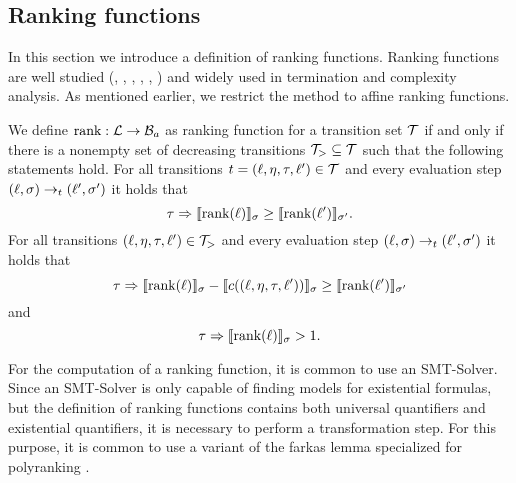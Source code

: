 \subsection{Ranking functions}

In this section we introduce a definition of ranking functions.
Ranking functions are well studied (\cite{bradley2005polyranking}, \cite{podelski2004prf}, \cite{bradley2005linear}, \cite{bagnara2012new}, \cite{leike2014ranking}, \cite{ben2013linear}) and widely used in termination and complexity analysis.
As mentioned earlier, we restrict the method to affine ranking functions.

\begin{definition} 
	We define $\text{rank}: \mathcal{L} \rightarrow \mathcal{B}_a$ as ranking function for a transition set $\mathcal{T}$ if and only if there is a nonempty set of decreasing transitions $\mathcal{T}_{>} \subseteq \mathcal{T}$ such that the following statements hold.
        For all transitions $t = (\ell, \eta, \tau, \ell') \in \mathcal{T}$ and every evaluation step $(\ell, \sigma) \rightarrow_t (\ell', \sigma')$ it holds that
	\[ \tau \Rightarrow \llbracket \text{rank}(\ell) \rrbracket_{\sigma} \geq \llbracket \text{rank}(\ell') \rrbracket_{\sigma'}. \]
        For all transitions $(\ell, \eta, \tau, \ell') \in \mathcal{T}_{>}$ and every evaluation step $(\ell, \sigma) \rightarrow_t (\ell', \sigma')$ it holds that        
	\[ \tau \Rightarrow \llbracket \text{rank}(\ell) \rrbracket_{\sigma} - \llbracket c((\ell, \eta, \tau, \ell')) \rrbracket_{\sigma} \geq \llbracket \text{rank}(\ell') \rrbracket_{\sigma'} \]
        and
	\[ \tau \Rightarrow \llbracket \text{rank}(\ell) \rrbracket_{\sigma} > 1. \]
\end{definition}


For the computation of a ranking function, it is common to use an SMT-Solver.
Since an SMT-Solver is only capable of finding models for existential formulas, but the definition of ranking functions contains both universal quantifiers and existential quantifiers, it is necessary to perform a transformation step.
For this purpose, it is common to use a variant of the farkas lemma \cite{schrijver1998theory} specialized for polyranking \cite{bradley2005polyranking}.

